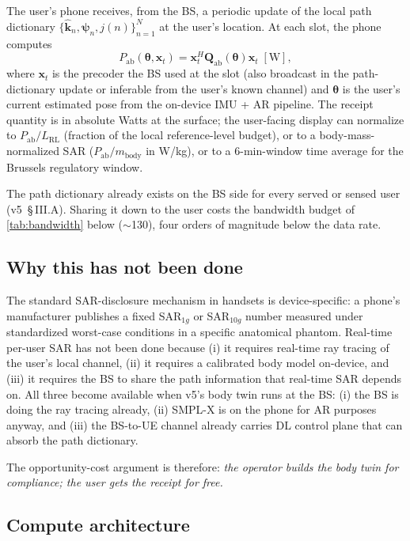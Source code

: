 \documentclass[11pt,a4paper]{article}
\theoremstyle{definition}
\newcommand{\khat}{\hat{\bm{k}}}
\newcommand{\Qabs}{\mathbf{Q}_{\mathrm{ab}}}
\newcommand{\xvec}{\mathbf{x}}
\newcommand{\thetab}{\bm{\theta}}
\newcommand{\Pabs}{P_{\mathrm{ab}}}
\begin{document}
The user's phone receives, from the BS, a periodic update of the
local path dictionary
$\{\khat_n,\bm\psi_n,j(n)\}_{n=1}^N$ at the user's location.  At
each slot, the phone computes
\begin{equation}\label{eq:sar-receipt}
  \Pabs(\thetab,\xvec_t)=\xvec_t^H\Qabs(\thetab)\xvec_t
  \;[\mathrm{W}],
\end{equation}
where $\xvec_t$ is the precoder the BS used at the slot (also
broadcast in the path-dictionary update or inferable from the
user's known channel) and $\thetab$ is the user's current
estimated pose from the on-device IMU + AR pipeline.  The receipt
quantity is in absolute Watts at the surface; the user-facing
display can normalize to $\Pabs/L_{\mathrm{RL}}$ (fraction of the
local reference-level budget), or to a body-mass-normalized SAR
($\Pabs/m_{\mathrm{body}}$ in W/kg), or to a 6-min-window time
average for the Brussels regulatory window.

The path dictionary already exists on the BS side for every served
or sensed user (v5~\S\,III.A).  Sharing it down to the user costs
the bandwidth budget of \cref{tab:bandwidth} below
($\sim$\SI{130}{\kbps}), four orders of magnitude below the data
rate.

\subsection{Why this has not been done}

The standard SAR-disclosure mechanism in handsets is
device-specific: a phone's manufacturer publishes a fixed
SAR$_{1g}$ or SAR$_{10g}$ number measured under standardized
worst-case conditions in a specific anatomical phantom.  Real-time
per-user SAR has not been done because (i) it requires real-time
ray tracing of the user's local channel, (ii) it requires a
calibrated body model on-device, and (iii) it requires the BS to
share the path information that real-time SAR depends on.  All
three become available when v5's body twin runs at the BS:
(i) the BS is doing the ray tracing already, (ii) SMPL-X is on
the phone for AR purposes anyway, and (iii) the BS-to-UE channel
already carries DL control plane that can absorb the path
dictionary.

The opportunity-cost argument is therefore:
\emph{the operator builds the body twin for compliance; the user
gets the receipt for free.}

\subsection{Compute architecture}
\end{document}
